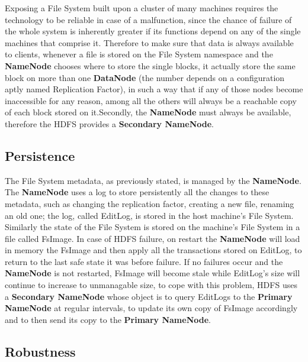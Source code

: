 Exposing a File System built upon a cluster of many machines requires the technology to be reliable in case of a malfunction, since the chance of failure of the whole system is inherently greater if its functions depend on any of the single machines that comprise it. \newline Therefore to make sure that data is always available to clients, whenever a file is stored on the File System namespace and the \textbf{NameNode} chooses where to store the single blocks, it actually store the same block on more than one \textbf{DataNode} (the number depends on a configuration aptly named Replication Factor), in such a way that if any of those nodes become inaccessible for any reason, among all the others will always be a reachable copy of each block stored on it.\newline Secondly, the \textbf{NameNode} must always be available, therefore the HDFS provides a \textbf{Secondary NameNode}.

\subsection{Persistence}

The File System metadata, as previously stated, is managed by the \textbf{NameNode}. The \textbf{NameNode} uses a log to store persistently all the changes to these metadata, such as changing the replication factor, creating a new file, renaming an old one; the log, called EditLog, is stored in the host machine's File System. Similarly the state of the File System is stored on the machine's File System in a file called FsImage.\newline
In case of HDFS failure, on restart the \textbf{NameNode} will load in memory the FsImage and then apply all the transactions stored on EditLog, to return to the last safe state it was before failure.
\newline
If no failures occur and the \textbf{NameNode} is not restarted, FsImage will become stale while EditLog's size will continue to increase to unmanagable size, to cope with this problem, HDFS uses a \textbf{Secondary NameNode} whose object is to query EditLogs to the \textbf{Primary NameNode} at regular intervals, to update its own copy of FsImage accordingly and to then send its copy to the \textbf{Primary NameNode}.

\subsection{Robustness}

